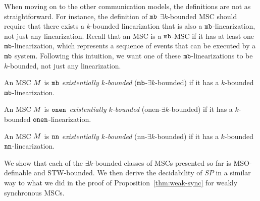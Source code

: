 When moving on to the other communication models, the definitions are not as straightforward. For instance, the definition of $\mathtt{mb}$ $\exists k$-bounded MSC should require that there exists a $k$-bounded linearization that is also a $\mathtt{mb}$-linearization, not just any linearization. Recall that an MSC is a $\mathtt{mb}$-MSC if it has at least one $\mathtt{mb}$-linearization, which represents a sequence of events that can be executed by a $\mathtt{mb}$ system. Following this intuition, we want one of these $\mathtt{mb}$-linearizations to be $k$-bounded, not just any linearization.

\begin{definition}
	An MSC $M$ is \emph{$\mathtt{mb}$ existentially $k$-bounded} ($\mathtt{mb}$-$\exists k$-bounded) if it has a $k$-bounded $\mathtt{mb}$-linearization.
\end{definition}

\begin{definition}
	An MSC $M$ is \emph{$\mathtt{onen}$ existentially $k$-bounded} (onen-$\exists k$-bounded) if it has a $k$-bounded $\mathtt{onen}$-linearization.
\end{definition}

\begin{definition}
	An MSC $M$ is \emph{$\mathtt{nn}$ existentially $k$-bounded} (nn-$\exists k$-bounded) if it has a $k$-bounded $\mathtt{nn}$-linearization.
\end{definition}

We show that each of the $\exists k$-bounded classes of MSCs presented so far is MSO-definable and STW-bounded. We then derive the decidability of $SP$ in a similar way to what we did in the proof of Proposition~\ref{thm:weak-sync} for weakly synchronous MSCs.

